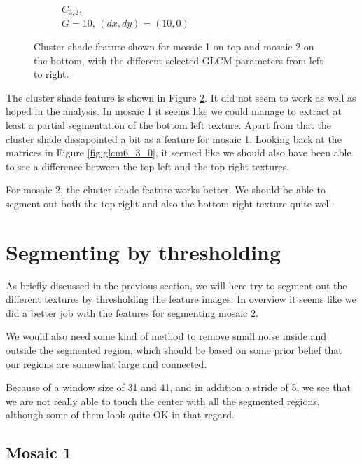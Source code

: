 \documentclass[a4paper]{article}
\begin{document}
\begin{figure}
\begin{subfigure}[b]{0.30\textwidth}
        \caption{%
            $C_{3,2}$, \\
            $G=10$, $(dx, dy)=(10,0)$
        }
        \label{fig:c32}
    \end{subfigure}

    \caption{%
        Cluster shade feature shown for mosaic 1 on top and mosaic 2 on
        the bottom, with the different selected GLCM parameters from
        left to right.
    }
    \label{fig:cls}
\end{figure}

The cluster shade feature is shown in Figure \ref{fig:cls}. It did not
seem to work as well as hoped in the analysis. In mosaic 1 it seems like
we could manage to extract at least a partial segmentation of the bottom
left texture. Apart from that the cluster shade dissapointed a bit as a
feature for mosaic 1. Looking back at the matrices in Figure
\ref{fig:glcm6_3_0}, it seemed like we should also have been able to see
a difference between the top left and the top right textures.

For mosaic 2, the cluster shade feature works better. We should be able
to segment out both the top right and also the bottom right texture
quite well.

\section{Segmenting by thresholding}

As briefly discussed in the previous section, we will here try to
segment out the different textures by thresholding the feature images.
In overview it seems like we did a better job with the features for
segmenting mosaic 2.

We would also need some kind of method to remove small noise inside and
outside the segmented region, which should be based on some prior belief
that our regions are somewhat large and connected.

Because of a window size of 31 and 41, and in addition a stride of 5, we
see that we are not really able to touch the center with all the
segmented regions, although some of them look quite OK in that regard.

\subsection{Mosaic 1}
\end{document}
